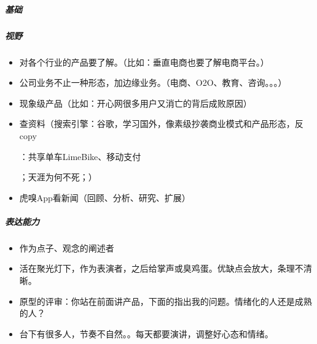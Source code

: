 \documentclass[letterpaper,10pt,english]{sphinxmanual}
\begin{document}
\subparagraph{基础}
\label{\detokenize{chapter_introduction/PM:id46}}

\subparagraph{视野}
\label{\detokenize{chapter_introduction/PM:id47}}\begin{itemize}
\item {} 
对各个行业的产品要了解。（比如：垂直电商也要了解电商平台。）

\item {} 
公司业务不止一种形态，加边缘业务。（电商、O2O、教育、咨询。。。）

\item {} 
现象级产品（比如：开心网很多用户又消亡的背后成败原因）

\item {} 
查资料（搜索引擎：谷歌，学习国外，像素级抄袭商业模式和产品形态，反copy%
\begin{footnote}[196]\sphinxAtStartFootnote
{}
%
\end{footnote}：共享单车LimeBike、移动支付%
\begin{footnote}[197]\sphinxAtStartFootnote
{}
%
\end{footnote}；天涯为何不死；）

\item {} 
虎嗅App看新闻（回顾、分析、研究、扩展）

\end{itemize}


\subparagraph{表达能力}
\label{\detokenize{chapter_introduction/PM:id48}}\begin{itemize}
\item {} 
作为点子、观念的阐述者

\item {} 
活在聚光灯下，作为表演者，之后给掌声或臭鸡蛋。优缺点会放大，条理不清晰。

\item {} 
原型的评审：你站在前面讲产品，下面的指出我的问题。情绪化的人还是成熟的人？

\item {} 
台下有很多人，节奏不自然。。每天都要演讲，调整好心态和情绪。

\end{itemize}
\end{document}
